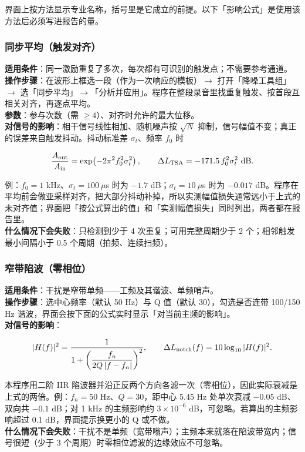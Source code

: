 \documentclass[UTF8,a4paper,12pt,scheme=chinese]{ctexart}
\begin{document}
界面上按方法显示专业名称，括号里是它成立的前提。以下「影响公式」是使用该方法后必须写进报告的量。

\subsubsection{同步平均（触发对齐）}

\textbf{适用条件}：同一激励重复了多次，每次都有可识别的触发点；不需要参考通道。\\
\textbf{操作步骤}：在波形上框选一段（作为一次响应的模板）$\rightarrow$ 打开「降噪工具组」$\rightarrow$ 选「同步平均」$\rightarrow$「分析并应用」。程序在整段录音里找重复触发、按首段互相关对齐，再逐点平均。\\
\textbf{参数}：参与次数（需 $\ge 4$）、对齐时允许的最大位移。\\
\textbf{对信号的影响}：相干信号线性相加、随机噪声按 $\sqrt{N}$ 抑制，信号幅值不变；真正的误差来自触发抖动。抖动标准差 $\sigma_t$、频率 $f_0$ 时

\[
\frac{A_{\rm out}}{A_{\rm in}}=\exp\!\left(-2\pi^{2}f_0^{2}\sigma_t^{2}\right),
\qquad
\Delta L_{\rm TSA}=-171.5\,f_0^{2}\sigma_t^{2}\ {\rm dB}.
\]

例：$f_0=1$ kHz、$\sigma_t=100\ \mu$s 时为 $-1.7$ dB；$\sigma_t=10\ \mu$s 时为 $-0.017$ dB。程序在平均前会做亚采样对齐，把大部分抖动补掉，所以实测幅值损失通常远小于上式的未对齐值；界面把「按公式算出的值」和「实测幅值损失」同时列出，两者都在报告里。\\
\textbf{什么情况下会失败}：只检测到少于 4 次重复；可用完整周期少于 2 个；相邻触发最小间隔小于 0.5 个周期（拍频、连续扫频）。

\subsubsection{窄带陷波（零相位）}

\textbf{适用条件}：干扰是窄带单频——工频及其谐波、单频哨声。\\
\textbf{操作步骤}：选中心频率（默认 50 Hz）与 Q 值（默认 30），勾选是否连带 100/150 Hz 谐波，界面会按下面的公式实时显示「对当前主频的影响」。\\
\textbf{对信号的影响}：

\[
|H(f)|^{2}=\frac{1}{1+\left(\dfrac{f_n}{2Q\,|f-f_n|}\right)^{2}},
\qquad
\Delta L_{\rm notch}(f)=10\log_{10}|H(f)|^{2}.
\]

本程序用二阶 IIR 陷波器并沿正反两个方向各滤一次（零相位），因此实际衰减是上式的两倍。例：$f_n=50$ Hz、$Q=30$，距中心 5.45 Hz 处单次衰减 $-0.05$ dB、双向共 $-0.1$ dB；对 1 kHz 的主频影响约 $3\times10^{-6}$ dB，可忽略。若算出的主频影响超过 0.1 dB，界面提示换更小的 Q 或不做。\\
\textbf{什么情况下会失败}：干扰不是单频（宽带嗡声）；主频本来就落在陷波带宽内；信号很短（少于 3 个周期）时零相位滤波的边缘效应不可忽略。
\end{document}
